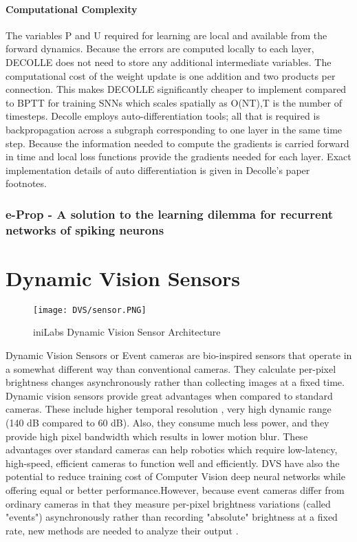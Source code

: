 \documentclass[12pt]{report}
\begin{document}
\subsubsection{Computational Complexity}
The variables P and U required for learning are local and available from the forward dynamics. Because the errors are computed locally to each layer, DECOLLE does not need to store any additional intermediate variables.  The computational cost of the weight update is one addition and two products per connection. This makes DECOLLE significantly cheaper to implement compared to BPTT for training SNNs which scales spatially as O(NT),T is the number of timesteps. Decolle employs auto-differentiation tools; all that is required is backpropagation across a subgraph corresponding to one layer in the same time step. Because the information needed to compute the gradients is carried forward in time and local loss functions provide the gradients needed for each layer. Exact implementation details of auto differentiation is given in Decolle's paper footnotes.



\subsection{e-Prop - A solution to the learning dilemma for recurrent networks of spiking neurons}

\chapter{Dynamic Vision Sensors}

\begin{wrapfigure}{r}{0.25\textwidth} %
    \centering
     \texttt{[image: DVS/sensor.PNG]}
    \caption{iniLabs Dynamic Vision Sensor Architecture}
    \label{fig:dvs-sensor}
\end{wrapfigure}

Dynamic Vision Sensors or Event cameras are bio-inspired sensors that operate in a somewhat different way than conventional cameras. They calculate per-pixel brightness changes asynchronously rather than collecting images at a fixed time. Dynamic vision sensors provide great advantages when compared to standard cameras. These include higher temporal resolution , very high dynamic range (140 dB compared to 60 dB). Also, they consume much less power, and they provide high pixel bandwidth which results in lower motion blur.  These advantages over standard cameras can help robotics which require low-latency, high-speed, efficient cameras to function well and efficiently. DVS have also the potential to reduce training cost of Computer Vision deep neural networks while offering equal or better performance.However, because event cameras differ from ordinary cameras in that they measure per-pixel brightness variations (called "events") asynchronously rather than recording "absolute" brightness at a fixed rate, new methods are needed to analyze their output .
\end{document}
